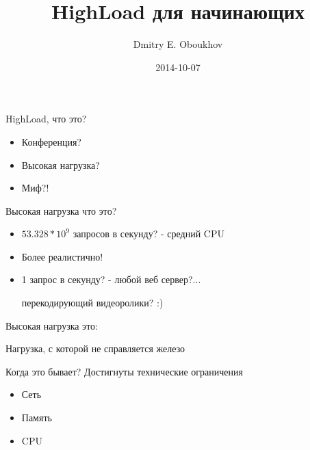 \documentclass[aspectratio=169]{beamer}
\title{HighLoad для начинающих}
\author{Dmitry E. Oboukhov}
\date{2014-10-07}
\begin{document}
\maketitle

\begin{frame}{HighLoad, что это?}
    \begin{itemize}

        \item Конференция?
        
        \pause
        \item Высокая нагрузка?

        \pause
        \item Миф?!
    
    \end{itemize}
\end{frame}

\begin{frame}{Высокая нагрузка что это?}
    \begin{itemize}
        
        \pause
        \item $53.328 * 10^9$  запросов в секунду?
            \pause
            {\small - средний CPU}

        \pause
        \item Более реалистично!

        \pause
        \item 1 запрос в секунду?
            \pause
            - любой веб сервер?...
            \pause
            \par {\small перекодирующий видеоролики? :)}
    \end{itemize}
\end{frame}

\begin{frame}{Высокая нагрузка это:}
    \pause
    \begin{center}
        {\huge Нагрузка, с которой не справляется железо}
    \end{center}
\end{frame}

\begin{frame}{Когда это бывает?}
    \pause
    {\large Достигнуты технические ограничения}
    \begin{itemize}
        \pause
        \item Сеть
        
        \pause
        \item Память
        
        \pause
        \item CPU
    \end{itemize}
\end{frame}
\end{document}
